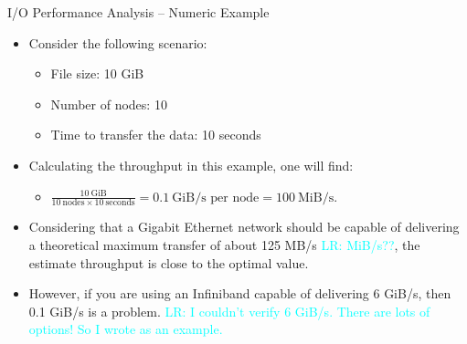 \documentclass[compress,11pt,xcolor=svgnames,aspectratio=169]{beamer}
\newcommand{\lr}[1]{\textcolor{cyan}{LR: #1}}
\begin{document}
\begin{frame}[fragile]{I/O Performance Analysis -- Numeric Example}

\begin{itemize}
\setlength\itemsep{0.2cm}

  \item Consider the following scenario:

    \begin{itemize}
    \setlength\itemsep{0.1cm}
      \item File size: 10 GiB
      \item Number of nodes: 10
      \item Time to transfer the data: 10 seconds
    \end{itemize}

  \item Calculating the throughput in this example, one will find:\\[0.2cm]

    \begin{itemize}
    \setlength\itemsep{0.2cm}
      \item $\displaystyle \frac{10\ \text{GiB}}{10\ \text{nodes} \times 10\ \text{seconds}} = 0.1\ \text{GiB/s per node} = 100\ \text{MiB/s}$.
    \end{itemize}

  \item Considering that a Gigabit Ethernet network should be capable of delivering a theoretical maximum transfer of about 125 MB/s \lr{MiB/s??}, the estimate throughput is close to the optimal value.

  \item However, if you are using an Infiniband capable of delivering 6 GiB/s, then 0.1 GiB/s is a problem.  \lr{I couldn't verify 6 GiB/s. There are lots of options! So I wrote as an example.}

\end{itemize}

\end{frame}
\end{document}
